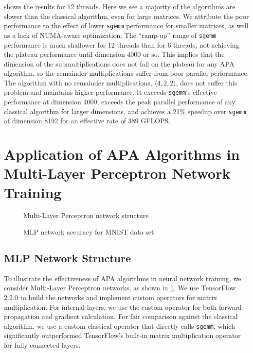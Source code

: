 \documentclass[conference]{IEEEtran}
\newcommand{\dims}[1]{\langle #1 \rangle}
\newcommand{\datafile}{}
\newcommand{\set}{}
\begin{document}
 shows the results for 12 threads.
Here we see a majority of the algorithms are slower than the classical algorithm, even for large matrices.
We attribute the poor performance to the effect of lower \texttt{sgemm} performance for smaller matrices, as well as a lack of NUMA-aware optimization.
The ``ramp-up'' range of \texttt{sgemm} performance is much shallower for 12 threads than for 6 threads, not achieving the plateau performance until dimension 4000 or so.
This implies that the dimension of the submultiplications does not fall on the plateau for any APA algorithm, so the remainder multiplications suffer from poor parallel performance.
The algorithm with no remainder multiplications, $\dims{4,2,2}$, does not suffer this problem and maintains higher performance.
It exceeds \texttt{sgemm}'s effective performance at dimension 4000, exceeds the peak parallel performance of any classical algorithm for larger dimensions, and achieves a 21\% speedup over \texttt{sgemm} at dimension 8192 for an effective rate of 389 GFLOPS.

\section{Application of APA Algorithms in Multi-Layer Perceptron Network Training}

\begin{figure}[b]
\centering

\caption{Multi-Layer Perceptron network structure}
\label{fig:neuralnet}
\end{figure}

\begin{figure*}[ht!]
%
\subfloat[Training accuracy]{
\centering
\renewcommand{\datafile}{data/NN_acc.dat}
\renewcommand{\set}{train}

\label{fig:NN_acc_train}}
%
\hfill
\subfloat[Test accuracy]{
\centering
\renewcommand{\datafile}{data/NN_acc.dat}
\renewcommand{\set}{test}

\label{fig:NN_acc_test}}
%
\caption{MLP network accuracy for MNIST data set}
\label{fig:NN_acc}
\end{figure*}

\subsection{MLP Network Structure}

To illustrate the effectiveness of APA algorithms in neural network training, we consider Multi-Layer Perceptron networks, as shown in \cref{fig:neuralnet}.
We use TensorFlow 2.2.0 to build the networks and implement custom operators for matrix multiplication.
For internal layers, we use the custom operator for both forward propagation and gradient calculation.
For fair comparison against the classical algorithm, we use a custom classical operator that directly calls \texttt{sgemm}, which significantly outperformed TensorFlow's built-in matrix multiplication operator for fully connected layers.
\end{document}

